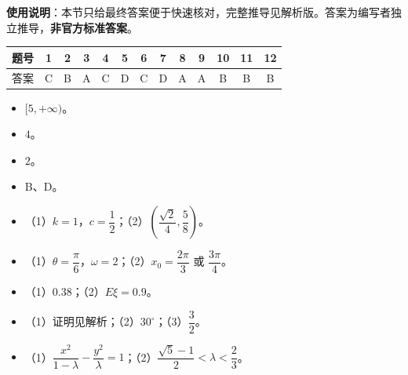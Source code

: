
\begin{gknotice}
\textbf{使用说明}：本节只给最终答案便于快速核对，完整推导见解析版。答案为编写者独立推导，\textbf{非官方标准答案}。
\end{gknotice}

\begin{center}\begin{tabular}{ccccccccccccc}
\toprule
题号 & 1 & 2 & 3 & 4 & 5 & 6 & 7 & 8 & 9 & 10 & 11 & 12 \\
\midrule
答案 & C & B & A & C & D & C & D & A & A & B & B & B \\
\bottomrule
\end{tabular}\end{center}

\begin{itemize}[leftmargin=2.6em]
  \item[\textbf{13.}] $[5,+\infty)$。
  \item[\textbf{14.}] $4$。
  \item[\textbf{15.}] $2$。
  \item[\textbf{16.}] B、D。
\end{itemize}

\begin{itemize}[leftmargin=2.6em]
  \item[\textbf{17.}] （1）$k=1$，$c=\dfrac12$；（2）$\left(\dfrac{\sqrt2}{4},\dfrac58\right)$。
  \item[\textbf{18.}] （1）$\theta=\dfrac{\pi}{6}$，$\omega=2$；（2）$x_0=\dfrac{2\pi}{3}$ 或 $\dfrac{3\pi}{4}$。
  \item[\textbf{19.}] （1）$0.38$；（2）$E\xi=0.9$。
  \item[\textbf{20.}] （1）证明见解析；（2）$30^\circ$；（3）$\dfrac32$。
  \item[\textbf{21.}] （1）$\dfrac{x^2}{1-\lambda}-\dfrac{y^2}{\lambda}=1$；（2）$\dfrac{\sqrt5-1}{2}<\lambda<\dfrac23$。
\end{itemize}
